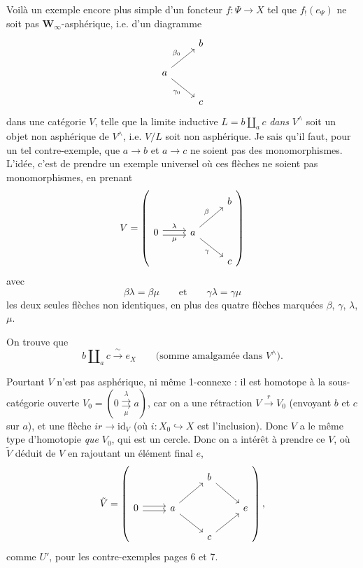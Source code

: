 \documentclass[11pt]{article}
\newcommand{\printedpage}[1]{\marginpar{\footnotesize p.~#1}}
\newcommand{\msp}[1]{\marginpar{\footnotesize [#1]}}
\newcommand{\id}{\mathrm{id}}
\newcommand{\Winf}{\mathbf{W}_{\infty}}
\begin{document}
Voilà un exemple encore plus simple d'un foncteur $f : \Psi \longrightarrow X$ tel que $f_!(e_{\Psi})$ ne soit pas $\Winf$-asphérique, i.e. d'un diagramme
\[
\begin{tikzcd}
& b \\
a \arrow[ur, "\beta_0"] \arrow[dr, "\gamma_0"'] & \\
& c
\end{tikzcd}
\]
\printedpage{6}
\msp{page 8}
dans une catégorie $V$, telle que la limite inductive $L = b \amalg_a c$ \textit{dans} $V^{\wedge}$ soit un objet non asphérique de $V^{\wedge}$, i.e. $V/L$ soit non asphérique. Je sais qu'il faut, pour un tel contre-exemple, que $a \longrightarrow b$ et $a \longrightarrow c$ ne soient pas des monomorphismes. L'idée, c'est de prendre un exemple universel où ces flèches ne soient pas monomorphismes, en prenant
\msp{page 9}
\[
V = \left(
\begin{tikzcd}
& & b \\
0 \arrow[r, shift left, "\lambda"] \arrow[r, shift right, "\mu"'] & a \arrow[ur, "\beta"] \arrow[dr, "\gamma"'] & \\
& & c
\end{tikzcd}
\right)
\]
avec
\[ \beta\lambda = \beta\mu \qquad \text{et} \qquad \gamma\lambda = \gamma\mu \]
les deux seules flèches non identiques, en plus des quatre flèches marquées $\beta$, $\gamma$, $\lambda$, $\mu$.

On trouve que
\[ b \amalg_a c \xrightarrow{\ \sim\ } e_X \qquad \text{(somme amalgamée dans } V^{\wedge}\text{).} \] %

Pourtant $V$ n'est pas asphérique, ni même 1-connexe : il est homotope à la sous-catégorie ouverte $V_0 = (0 \overset{\lambda}{\underset{\mu}{\rightrightarrows}} a)$, car on a une rétraction $V \xrightarrow{\ r\ } V_0$ (envoyant $b$ et $c$ sur $a$), et une flèche $ir \longrightarrow \id_V$ (où $i : X_0 \hookrightarrow X$ est l'inclusion). Donc $V$ a le même type d'homotopie \textit{que} $V_0$, qui est un cercle. Donc on a intérêt à prendre ce $V$, où $\tilde{V}$ déduit de $V$ en rajoutant un élément final $e$, %
\[
\tilde{V} = \left(
\begin{tikzcd}
& & b \arrow[dr] & \\
0 \arrow[r, shift left] \arrow[r, shift right] & a \arrow[ur] \arrow[dr] & & e \\
& & c \arrow[ur] &
\end{tikzcd}
\right),
\]
comme $U'$, pour les contre-exemples pages 6 et 7.
\end{document}
